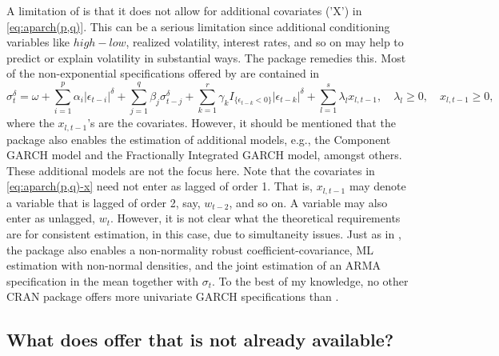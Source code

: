 A limitation of  is that it does not allow for additional covariates ('X') in \eqref{eq:aparch(p,q)}. This can be a serious limitation since additional conditioning variables like $high-low$, realized volatility, interest rates, and so on may help to predict or explain volatility in substantial ways. The  package remedies this. Most of the non-exponential specifications offered by  are contained in
%
\begin{equation}\label{eq:aparch(p,q)-x}
	\sigma_t^\delta = \omega + \sum_{i=1}^p \alpha_i |\epsilon_{t-i}|^\delta + \sum_{j=1}^q \beta_j \sigma_{t-j}^\delta + \sum_{k=1}^r \gamma_k I_{ \{\epsilon_{t-k} < 0 \} } |\epsilon_{t-k}|^\delta + \sum_{l=1}^s \lambda_l x_{l,t-1}, \quad \lambda_l \geq 0, \quad x_{l,t-1} \geq 0,
\end{equation}
%
where the $x_{l,t-1}$'s are the covariates. However, it should be mentioned that the package also enables the estimation of additional models, e.g., the Component GARCH model and the Fractionally Integrated GARCH model, amongst others. These additional models are not the focus here. Note that the covariates in \eqref{eq:aparch(p,q)-x} need not enter as lagged of order 1. That is, $x_{l,t-1}$ may denote a variable that is lagged of order 2, say, $w_{t-2}$, and so on. A variable may also enter as unlagged, $w_t$. However, it is not clear what the theoretical requirements are for consistent estimation, in this case, due to simultaneity issues. Just as in , the  package also enables a non-normality robust coefficient-covariance, ML estimation with non-normal densities, and the joint estimation of an ARMA specification in the mean together with $\sigma_t$. To the best of my knowledge, no other CRAN package offers more univariate GARCH specifications than . 

\subsection{What does  offer that is not already available?}

